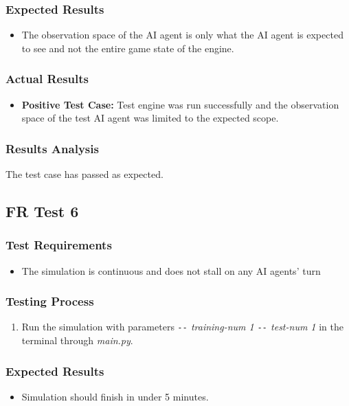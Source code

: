 \documentclass[12pt, titlepage]{article}
\providecommand{\DIFaddbegin}{} %
\providecommand{\DIFaddend}{} %
\begin{document}
\subsubsection{Expected Results}
\begin{itemize}
    \item The observation space of the AI agent is only what the AI agent is expected to see and not the entire game state of the engine. 
\end{itemize}
\subsubsection{Actual Results}
\begin{itemize}
    \item \textbf{Positive Test Case:} Test engine was run successfully and the observation space of the test AI agent was limited to the expected scope.
\end{itemize}
\subsubsection{Results Analysis}
The test case has passed as expected.

\subsection{FR Test 6}\DIFaddbegin \label{FRT6} 
\DIFaddend \subsubsection{Test Requirements}
\begin{itemize}
    \item The simulation is continuous and does not stall on any AI agents' turn
\end{itemize}
\subsubsection{Testing Process}
\begin{enumerate}
    \item Run the simulation with parameters \textit{\texttt{-{}-}
training-num 1 \texttt{-{}-}
test-num 1} in the terminal through \textit{main.py}.
\end{enumerate}
\subsubsection{Expected Results}
\begin{itemize}
    \item Simulation should finish in under 5 minutes.
\end{itemize}
\end{document}
